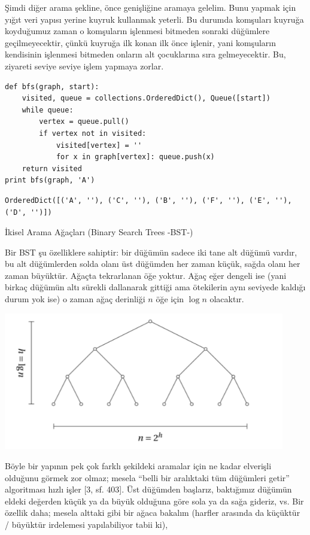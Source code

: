 \documentclass[12pt,fleqn]{article}\usepackage{../../common}
\begin{document}
Şimdi diğer arama şekline, önce genişliğine aramaya gelelim. Bunu yapmak
için yığıt veri yapısı yerine kuyruk kullanmak yeterli. Bu durumda
komşuları kuyruğa koyduğumuz zaman o komşuların işlenmesi bitmeden sonraki
düğümlere geçilmeyecektir, çünkü kuyruğa ilk konan ilk önce işlenir, yani
komşuların kendisinin işlenmesi bitmeden onların alt çocuklarına sıra
gelmeyecektir. Bu, ziyareti seviye seviye işlem yapmaya zorlar.

\begin{verbatim}
def bfs(graph, start):
    visited, queue = collections.OrderedDict(), Queue([start])
    while queue:
        vertex = queue.pull()
        if vertex not in visited:
            visited[vertex] = ''
            for x in graph[vertex]: queue.push(x)
    return visited
print bfs(graph, 'A')
\end{verbatim}

\begin{verbatim}
OrderedDict([('A', ''), ('C', ''), ('B', ''), ('F', ''), ('E', ''), ('D', '')])
\end{verbatim}

İkisel Arama Ağaçları (Binary Search Trees -BST-)

Bir BST şu özelliklere sahiptir: bir düğümün sadece iki tane alt düğümü
vardır, bu alt düğümlerden solda olanı üst düğümden her zaman küçük, sağda
olanı her zaman büyüktür. Ağaçta tekrarlanan öğe yoktur. Ağaç eğer dengeli
ise (yani birkaç düğümün altı sürekli dallanarak gittiği ama ötekilerin
aynı seviyede kaldığı durum yok ise) o zaman ağaç derinliği $n$ öğe için
$\log n$ olacaktır. 

\includegraphics[height=6cm]{basic_06.png}

Böyle bir yapının pek çok farklı şekildeki aramalar için ne kadar elverişli
olduğunu görmek zor olmaz; mesela ``belli bir aralıktaki tüm düğümleri
getir'' algoritması hızlı işler [3, sf. 403]. Üst düğümden başlarız,
baktığımız düğümün eldeki değerden küçük ya da büyük olduğuna göre sola ya
da sağa gideriz, vs. Bir özellik daha; mesela alttaki gibi bir ağaca
bakalım (harfler arasında da küçüktür / büyüktür irdelemesi yapılabiliyor
tabii ki),
\end{document}

